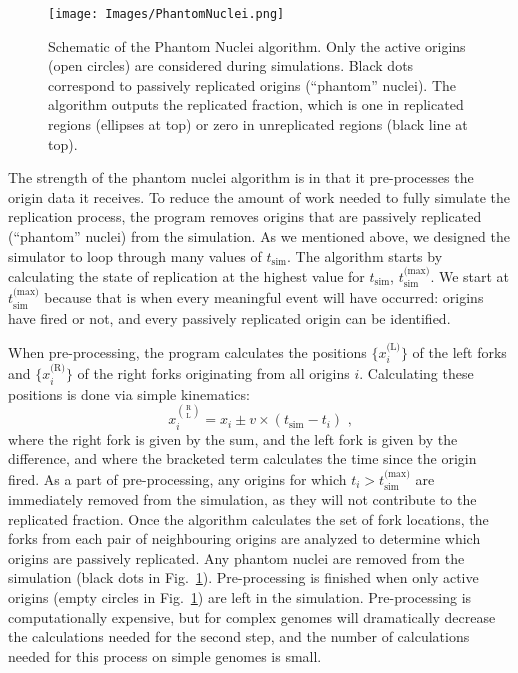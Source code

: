 		\begin{figure}[tbh]
			\begin{center}
				\texttt{[image: Images/PhantomNuclei.png]}
			\end{center}
				\caption[Phantom Nuclei Illustration]{\label{fig:phantom} Schematic of the Phantom Nuclei algorithm.
				Only the active origins (open circles) are considered during simulations.
				Black dots correspond to passively replicated origins (``phantom'' nuclei).
				The algorithm outputs the replicated fraction, which is one in replicated regions (ellipses at top) or zero in unreplicated regions (black line at top).
				}
		\end{figure}
			
		The strength of the phantom nuclei algorithm is in that it pre-processes the origin data it receives.
		To reduce the amount of work needed to fully simulate the replication process, the program removes origins that are passively replicated (``phantom'' nuclei) from the simulation.
		As we mentioned above, we designed the simulator to loop through many values of $t_\text{sim}$.
		The algorithm starts by calculating the state of replication at the highest value for $t_\text{sim}$, $t_\text{sim}^\text{(max)}$.
		We start at $t_\text{sim}^\text{(max)}$ because that is when every meaningful event will have occurred: origins have fired or not, and every passively replicated origin can be identified.
		
		When pre-processing, the program calculates the positions $\{x_i^\text{(L)}\}$ of the left forks and $\{x_i^\text{(R)}\}$ of the right forks originating from all origins $i$.
		Calculating these positions is done via simple kinematics:
		\begin{equation} \label{eq:findforks}
			x_i^{\binom{\text{R}}{\text{L}}} = x_i \pm v \times \left( t_\text{sim} - t_i\right) \text{ ,}
		\end{equation}
		where the right fork is given by the sum, and the left fork is given by the difference, and where the bracketed term calculates the time since the origin fired.
		As a part of pre-processing, any origins for which $t_i > t_\text{sim}^\text{(max)}$ are immediately removed from the simulation, as they will not contribute to the replicated fraction.
		Once the algorithm calculates the set of fork locations, the forks from each pair of neighbouring origins are analyzed to determine which origins are passively replicated.
		Any phantom nuclei are removed from the simulation (black dots in Fig.~\ref{fig:phantom}).
		Pre-processing is finished when only active origins (empty circles in Fig.~\ref{fig:phantom}) are left in the simulation.
		Pre-processing is computationally expensive, but for complex genomes will dramatically decrease the calculations needed for the second step, and the number of calculations needed for this process on simple genomes is small.
		
